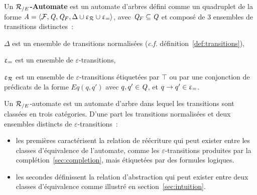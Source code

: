 \begin{definition}
  \label{def:re-automaton}
  Un \textbf{${\mathcal R_{/E}}$-Automate} est un automate d'arbres défini comme un quadruplet de la forme
  $\mathit A= \langle \mathcal{F}, \mathit Q, \mathit Q_F,\Delta \cup \upvarepsilon_{\mathcal R} \cup \upvarepsilon_{=}\rangle$,
  avec $\mathit Q_F \subseteq \mathit Q$ et composé de 3 ensembles de transitions distinctes~:

  \begin{description}
  \item $\Delta$ est un ensemble de transitions normalisées (\textit{c.f.} définition~\ref{def:transitions}),
  \item $\upvarepsilon_{=}$ est un ensemble de $\varepsilon$-transitions,
  \item $\upvarepsilon_{\mathcal R}$ est un ensemble de 
  $\varepsilon$-transitions étiquetées par $\top$ ou par une conjonction de prédicats de la forme $Eq(q, q')$ 
  avec $q, q' \in \mathit Q$, et $q \rightarrow q' \in \upvarepsilon_{=}$.
  \end{description}
\end{definition}


Un ${\mathcal R_{/E}}$-automate est un automate d'arbre dans lequel les transitions sont classées en trois catégories.  D'une part les
transitions normalisées et deux ensembles distincts de $\varepsilon$-transitions~:
\begin{itemize}
\item les premières caractérisent la relation de réécriture qui peut exister entre les classes
  d'équivalence de l'automate, comme les $\varepsilon$-transitions produites par la complétion~\ref{sec:completion}, 
  mais étiquetées par des formules logiques.

\item les secondes définissent la relation d'abstraction qui peut exister entre deux classes d'équivalence comme illustré en 
  section~\ref{sec:intuition}.
\end{itemize}







